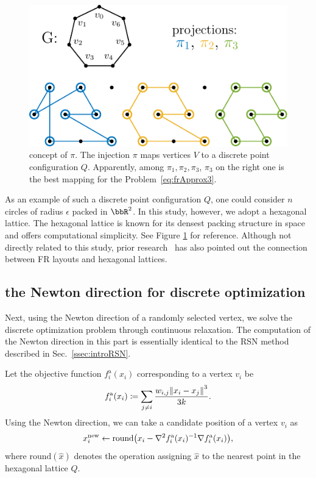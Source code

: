 \documentclass[dvipdfmx,journal]{IEEEtran}
\newcommand{\defeq}{\coloneqq}
\begin{document}
\begin{figure}[t]
    \centering
    \includegraphics[width=\columnwidth]{pi/pi.pdf}
    \caption{
        concept of $\pi$.
        The injection $\pi$ maps vertices $V$ to a discrete point configuration $Q$.
        Apparently, among $\pi_1, \pi_2, \pi_3$, $\pi_3$ on the right one is the best mapping for the Problem~\eqref{eq:frApprox3}.
    }
    \label{fig:pi}
\end{figure}

As an example of such a discrete point configuration $Q$, one could consider $n$ circles of radius $\epsilon$ packed in $\bbR^2$.
In this study, however, we adopt a hexagonal lattice.
The hexagonal lattice is known for its densest packing structure in space and offers computational simplicity.
See Figure \ref{fig:pi} for reference.
Although not directly related to this study, prior research~\cite{s22145179} has also pointed out the connection between FR layouts and hexagonal lattices.

\subsection{the Newton direction for discrete optimization}\label{ssec:newtonDirection}

Next, using the Newton direction of a randomly selected vertex, we solve the discrete optimization problem through continuous relaxation. The computation of the Newton direction in this part is essentially identical to the RSN method described in Sec.~\ref{ssec:introRSN}.

Let the objective function $f^{\mathrm{a}}_i(x_i)$ corresponding to a vertex $v_i$ be
\begin{equation*}
    f^{\mathrm{a}}_i(x_i) \defeq \sum_{j \neq i} \frac{w_{i,j}\norm{x_i - x_j}^3}{3k}.
\end{equation*}
Using the Newton direction, we can take a candidate position of a vertex $v_i$ as
\begin{equation*}
    x_i^\mathrm{new} \gets \mathrm{round}\qty(x_i - \nabla^2 f^{\mathrm{a}}_i(x_i)^{-1} \nabla f^{\mathrm{a}}_i(x_i)),
\end{equation*}
where $\mathrm{round}(\hat{x})$ denotes the operation assigning $\hat{x}$ to the nearest point in the hexagonal lattice $Q$.
\end{document}
